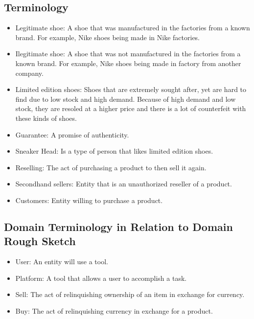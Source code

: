 \subsection{Terminology}
\begin{itemize}
  \item Legitimate shoe: A shoe that was manufactured in the factories from a known brand. For example, Nike shoes being made in Nike factories.
  \item Ilegitimate shoe: A shoe that was not manufactured in the factories from a known brand. For example, Nike shoes being made in factory from another company.
  \item Limited edition shoes: Shoes that are extremely sought after, yet are hard to find due to low stock and high demand. Because of high demand and low stock, they are resoled at a higher price and there is a lot of counterfeit with these kinds of shoes.
  \item Guarantee: A promise of authenticity.
  \item Sneaker Head: Is a type of person that likes limited edition shoes.
  \item Reselling: The act of purchasing a product to then sell it again.
  \item Secondhand sellers: Entity that is an unauthorized reseller of a product.
  \item Customers: Entity willing to purchase a product.
\end{itemize}
\subsection{Domain Terminology in Relation to Domain Rough Sketch}
\begin{itemize}
  \item User: An entity will use a tool.
  \item Platform: A tool that allows a user to accomplish a task.
  \item Sell: The act of relinquishing ownership of an item in exchange for currency.
  \item Buy: The act of relinquishing currency in exchange for a product.
\end{itemize}
